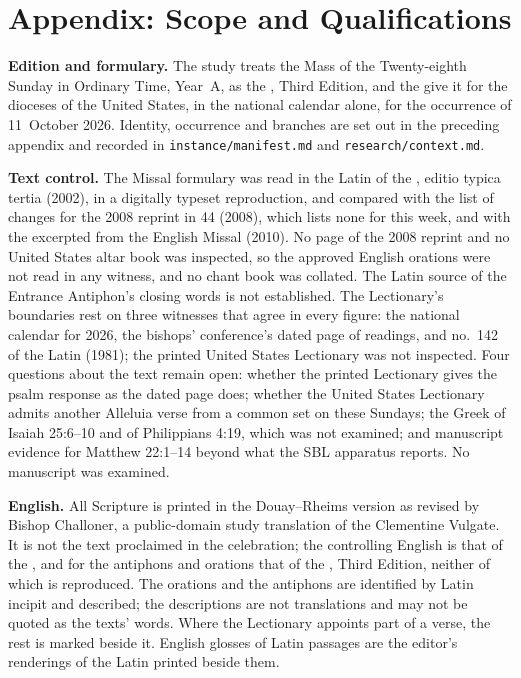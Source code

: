 \section{Appendix: Scope and Qualifications}
\label{sec:scope}

{\small
\textbf{Edition and formulary.} The study treats the Mass of the
Twenty-eighth Sunday in Ordinary Time, Year~A, as the ,
Third Edition, and the  give it for the dioceses of
the United States, in the national calendar alone, for the occurrence of
11~October 2026. Identity, occurrence and branches are set out in the
preceding appendix and recorded in \texttt{instance/manifest.md} and
\texttt{research/context.md}.

\textbf{Text control.} The Missal formulary was read in the Latin of the
, editio typica tertia (2002), in a digitally typeset
reproduction, and compared with the list of changes for the 2008 reprint in
 44 (2008), which lists none for this week, and with the
 excerpted from the English Missal (2010). No page of the
2008 reprint and no United States altar book was inspected, so the approved
English orations were not read in any witness, and no chant book was
collated. The Latin source of the Entrance Antiphon's closing words is not
established. The Lectionary's boundaries rest on three witnesses that agree in
every figure: the national calendar for 2026, the bishops' conference's dated
page of readings, and no.~142 of the Latin  (1981);
the printed United States Lectionary was not inspected. Four questions about
the text remain open: whether the printed Lectionary gives the psalm response
as the dated page does; whether the United States Lectionary admits another
Alleluia verse from a common set on these Sundays; the Greek of Isaiah 25:6--10
and of Philippians 4:19, which was not examined; and manuscript evidence for
Matthew 22:1--14 beyond what the SBL apparatus reports. No manuscript was
examined.

\textbf{English.} All Scripture is printed in the Douay--Rheims version as
revised by Bishop Challoner, a public-domain study translation of the
Clementine Vulgate. It is not the text proclaimed in the celebration; the
controlling English is that of the , and for the antiphons and orations
that of the , Third Edition, neither of which is reproduced.
The orations and the antiphons are identified by Latin incipit and described;
the descriptions are not translations and may not be quoted as the texts'
words. Where the Lectionary appoints part of a verse, the rest is marked
beside it. English glosses of Latin passages are the editor's renderings of
the Latin printed beside them.

}
